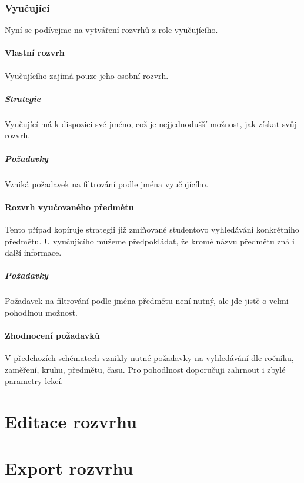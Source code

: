 \documentclass[a4paper, 11pt]{article}
\begin{document}
\section{Vyučující}
Nyní se podívejme na vytváření rozvrhů z role vyučujícího.

\subsection{Vlastní rozvrh}
Vyučujícího zajímá pouze jeho osobní rozvrh.

\subsubsection{Strategie}
Vyučující má k dispozici své jméno, což je nejjednodušší možnost, jak získat svůj rozvrh.

\subsubsection{Požadavky}
Vzniká požadavek na filtrování podle jména vyučujícího.

\subsection{Rozvrh vyučovaného předmětu}
Tento případ kopíruje strategii již zmiňované studentovo vyhledávání konkrétního předmětu. U vyučujícího můžeme předpokládat, že kromě názvu předmětu zná i další informace.

\subsubsection{Požadavky}
Požadavek na filtrování podle jména předmětu není nutný, ale jde jistě o velmi pohodlnou možnost.

\subsection{Zhodnocení požadavků}
V předchozích schématech vznikly nutné požadavky na vyhledávání dle ročníku, zaměření, kruhu, předmětu, času. Pro pohodlnost doporučuji zahrnout i zbylé parametry lekcí. 

\part{Editace rozvrhu}

\part{Export rozvrhu}
\end{document}
